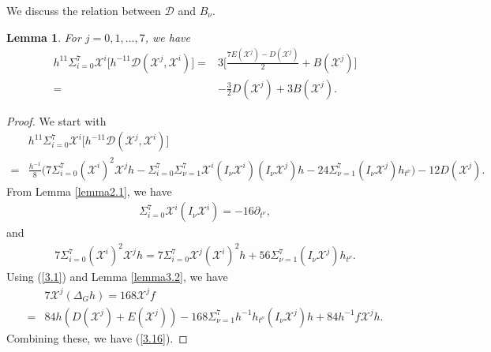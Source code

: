 \documentclass[10pt,a4paper]{amsart}
\numberwithin{equation}{section}
\newtheorem{lemma}[theorem]{Lemma}
\begin{document}
We discuss the relation between $\mathcal{D}$ and $B_\nu$.
\begin{lemma}\label{lemma3.3} For $j=0,1,...,7$, we have
\begin{equation}\label{3.16}
     \begin{aligned}
h^{11}\Sigma_{i=0}^7\mathscr{X}^i \bigg[h^{-11}\mathcal{D}(\mathscr{X}^j,\mathscr{X}^i)\bigg]=&3\bigg[\frac{7E(\mathscr{X}^j)-D(\mathscr{X}^j)}{2}+B(\mathscr{X}^j)\bigg]\\=&-\frac{3}{2}D(\mathscr{X}^j)+3B(\mathscr{X}^j).
        \end{aligned}\end{equation}
   \end{lemma}
\begin{proof}
We start with
    \begin{align*}
    &h^{11}\Sigma_{i=0}^7\mathscr{X}^i\bigg[h^{-11}\mathcal{D}(\mathscr{X}^j,\mathscr{X}^i)\bigg]\\=&\frac{h^{-1}}{8}\bigg(7\Sigma_{i=0}^7   
    (\mathscr{X}^i)^2\mathscr{X}^jh-        
    \Sigma_{i=0}^7    
    \Sigma_{\nu=1}^7\mathscr{X}^i(I_\nu\mathscr{X}^i)(I_\nu \mathscr{X}^j)h-24\Sigma_{\nu=1}^7(I_\nu \mathscr{X}^j)h_{t^\nu}\bigg)-12D(\mathscr{X}^j).
\end{align*}
From Lemma \ref{lemma2.1}, we have
\begin{align*}
    \Sigma_{i=0}^7\mathscr{X}^i (I_\nu \mathscr{X}^i)=-16\partial_{t^\nu},
\end{align*}
and
\begin{align*}
    7\Sigma_{i=0}^7 (\mathscr{X}^i)^2\mathscr{X}^jh=7\Sigma_{i=0}^7\mathscr{X}^j(\mathscr{X}^i)^2 h+56 \Sigma_{\nu=1}^7(I_\nu \mathscr{X}^j)h_{t^\nu} .
    \end{align*}
    Using (\ref{3.1}) and Lemma \ref{lemma3.2}, we have
    \begin{align*}
       & 7\mathscr{X}^j(\Delta_G h)=168\mathscr{X}^jf\\=&84h(D(\mathscr{X}^j)+E(\mathscr{X}^j))-168\Sigma_{\nu=1}^7h^{-1}h_{t^\nu}(I_\nu \mathscr{X}^j)h+84h^{-1}f\mathscr{X}^jh.
    \end{align*}
  Combining these, we have (\ref{3.16}).  
    \end{proof}









   
  
\end{document}
